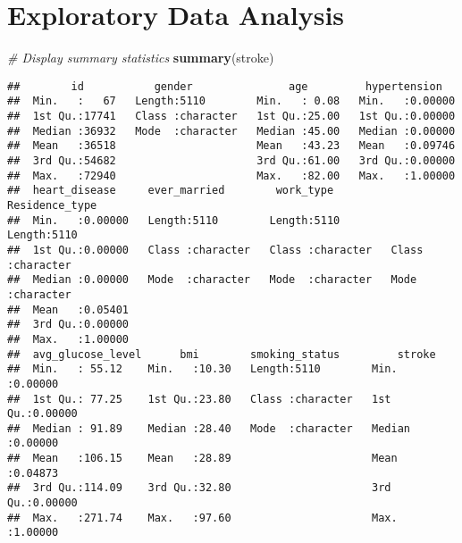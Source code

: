 \documentclass[
]{article}
\newenvironment{Shaded}{\begin{snugshade}}{\end{snugshade}}
\newcommand{\AttributeTok}[1]{\textcolor[rgb]{0.13,0.29,0.53}{#1}}
\newcommand{\CommentTok}[1]{\textcolor[rgb]{0.56,0.35,0.01}{\textit{#1}}}
\newcommand{\DecValTok}[1]{\textcolor[rgb]{0.00,0.00,0.81}{#1}}
\newcommand{\FunctionTok}[1]{\textcolor[rgb]{0.13,0.29,0.53}{\textbf{#1}}}
\newcommand{\NormalTok}[1]{#1}
\newcommand{\SpecialCharTok}[1]{\textcolor[rgb]{0.81,0.36,0.00}{\textbf{#1}}}
\newcommand{\StringTok}[1]{\textcolor[rgb]{0.31,0.60,0.02}{#1}}
\begin{document}
\hypertarget{exploratory-data-analysis}{%
\section{Exploratory Data Analysis}\label{exploratory-data-analysis}}

\begin{Shaded}
\begin{Highlighting}[]
\CommentTok{\# Display summary statistics}
\FunctionTok{summary}\NormalTok{(stroke)}
\end{Highlighting}
\end{Shaded}

\begin{verbatim}
##        id           gender               age         hypertension    
##  Min.   :   67   Length:5110        Min.   : 0.08   Min.   :0.00000  
##  1st Qu.:17741   Class :character   1st Qu.:25.00   1st Qu.:0.00000  
##  Median :36932   Mode  :character   Median :45.00   Median :0.00000  
##  Mean   :36518                      Mean   :43.23   Mean   :0.09746  
##  3rd Qu.:54682                      3rd Qu.:61.00   3rd Qu.:0.00000  
##  Max.   :72940                      Max.   :82.00   Max.   :1.00000  
##  heart_disease     ever_married        work_type         Residence_type    
##  Min.   :0.00000   Length:5110        Length:5110        Length:5110       
##  1st Qu.:0.00000   Class :character   Class :character   Class :character  
##  Median :0.00000   Mode  :character   Mode  :character   Mode  :character  
##  Mean   :0.05401                                                           
##  3rd Qu.:0.00000                                                           
##  Max.   :1.00000                                                           
##  avg_glucose_level      bmi        smoking_status         stroke       
##  Min.   : 55.12    Min.   :10.30   Length:5110        Min.   :0.00000  
##  1st Qu.: 77.25    1st Qu.:23.80   Class :character   1st Qu.:0.00000  
##  Median : 91.89    Median :28.40   Mode  :character   Median :0.00000  
##  Mean   :106.15    Mean   :28.89                      Mean   :0.04873  
##  3rd Qu.:114.09    3rd Qu.:32.80                      3rd Qu.:0.00000  
##  Max.   :271.74    Max.   :97.60                      Max.   :1.00000
\end{verbatim}

\begin{Shaded}
\end{Shaded}
\end{document}
